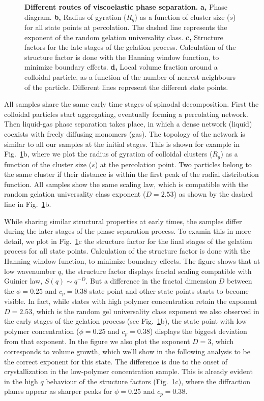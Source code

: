 \documentclass[twocolumn,showpacs,amsmath,amssymb,pre,superscriptaddress]{revtex4}
\begin{document}
\begin{figure}[!t]
 \caption{{\bf Different routes of viscoelastic phase separation.}
 \textbf{a,} {\color{blue}Phase diagram.}
 \textbf{b,} Radius of gyration ($R_g$) as a function of cluster size ($s$) for all state points at percolation. The
 dashed line represents the exponent of the random gelation universality class.
 \textbf{c,} Structure factors for the late stages of the gelation process. Calculation of the structure factor is done with the Hanning window function,  to minimize boundary effects.
 \textbf{d,} Local volume fraction around a colloidal particle, as a function of the number of nearest neighbours of the particle.
 Different lines represent the different state points.
 }
 \label{fig:phase_separation}
\end{figure}

All samples share the same early time stages of spinodal decomposition. First the colloidal particles start aggregating,
eventually forming a percolating network. Then liquid-gas phase separation takes place, in which a dense network (liquid)
coexists with freely diffusing monomers (gas). The topology of the network is similar to all our samples at the initial stages.
This is shown for example in Fig.~\ref{fig:phase_separation}b, where we plot the radius of gyration of colloidal clusters ($R_g$)
as a function of the cluster size ($s$) at the percolation point. Two particles belong to the same cluster if their distance is
within the first peak of the radial distribution function. All samples show the same scaling law, which is compatible with
the random gelation universality class exponent ($D=2.53$) as shown by the dashed line in Fig.~\ref{fig:phase_separation}b.

While sharing similar structural properties at early times, the samples differ during the later stages of the phase separation process.
To examin this in more detail, we plot in Fig.~\ref{fig:phase_separation}c the structure factor for the final stages of the gelation process for all state points.
Calculation of the structure factor is done with the Hanning window function, to minimize boundary effects.
The figure shows that at low wavenumber $q$, the structure factor displays fractal scaling compatible with Guinier law, $S(q)\sim q^{-D}$.
But a difference
in the fractal dimension $D$ between the $\phi=0.25$ and $c_p=0.38$ state point and other state points starts to become visible. In fact, while states
with high polymer concentration retain the exponent $D=2.53$,
which is the random gel universality class exponent we also observed in the early stages of the gelation process (see Fig.~\ref{fig:phase_separation}b),
the state point with low polymer concentration ($\phi=0.25$ and $c_p=0.38$) displays the biggest deviation from that exponent. In the figure we also
plot the exponent $D=3$, which corresponds to volume growth, which we'll show in the following analysis to be the correct exponent for this state.
The difference is due to the onset of crystallization in the low-polymer concentration sample. This is already evident in the high $q$ behaviour of
the structure factors (Fig.~\ref{fig:phase_separation}c), where the diffraction planes appear as sharper peaks for $\phi=0.25$ and $c_p=0.38$.
\end{document}
